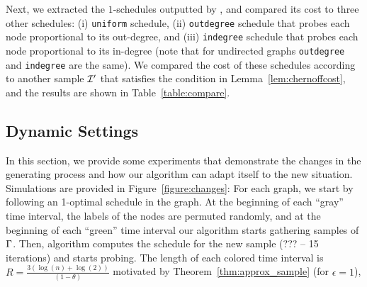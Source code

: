 %
%
%




Next, we extracted the $1$-schedules  outputted by \algonameapx, and compared its cost to three other  schedules: (i) \texttt{uniform} schedule, (ii) \texttt{outdegree} schedule that probes each node proportional to its out-degree, and (iii) \texttt{indegree} schedule that probes each node proportional to its in-degree (note that for undirected graphs \texttt{outdegree} and \texttt{indegree} are the same). We compared the cost of these schedules according to another sample $\mathcal{I}'$ that satisfies the condition in Lemma~\ref{lem:chernoffcost}, and the results are shown in Table~\ref{table:compare}.



\subsection{Dynamic Settings}\label{sec:dynset}
In this section, we provide some experiments that demonstrate the changes in the
generating process and how our algorithm can adapt itself to the new situation.
Simulations are provided in Figure~\ref{figure:changes}: For each graph, we
start by following an 1-optimal schedule in the graph. At the beginning of each
``gray'' time interval, the labels of the nodes are permuted randomly, and at
the beginning of each ``green'' time interval our algorithm starts gathering
samples of $\Gamma$. Then, algorithm computes the schedule for the new sample
(??? -- 15 iterations) and starts probing. The length of each colored time
interval is $R = \frac{3(\log(n)+\log(2))}{(1-\theta)}$ motivated by
Theorem~\ref{thm:approx_sample} (for $\epsilon=1$),

